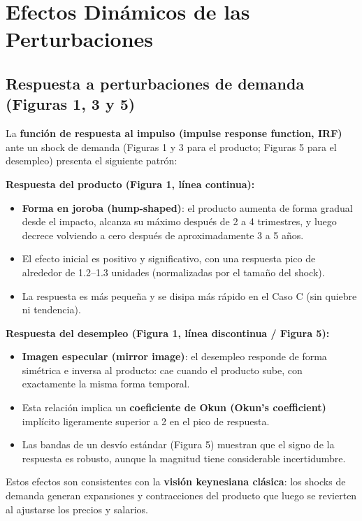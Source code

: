 \documentclass[12pt]{article}
\begin{document}
\section{Efectos Din\'amicos de las Perturbaciones}

\subsection{Respuesta a perturbaciones de demanda (Figuras 1, 3 y 5)}

La \textbf{funci\'on de respuesta al impulso (impulse response function, IRF)} ante un shock de demanda (Figuras 1 y 3 para el producto; Figuras 5 para el desempleo) presenta el siguiente patr\'on:

\textbf{Respuesta del producto (Figura 1, l\'inea continua):}
\begin{itemize}
  \item \textbf{Forma en joroba (hump-shaped)}: el producto aumenta de forma gradual desde el impacto, alcanza su m\'aximo despu\'es de 2 a 4 trimestres, y luego decrece volviendo a cero despu\'es de aproximadamente 3 a 5 a\~nos.
  \item El efecto inicial es positivo y significativo, con una respuesta pico de alrededor de 1.2--1.3 unidades (normalizadas por el tama\~no del shock).
  \item La respuesta es m\'as peque\~na y se disipa m\'as r\'apido en el Caso C (sin quiebre ni tendencia).
\end{itemize}

\textbf{Respuesta del desempleo (Figura 1, l\'inea discontinua / Figura 5):}
\begin{itemize}
  \item \textbf{Imagen especular (mirror image)}: el desempleo responde de forma sim\'etrica e inversa al producto: cae cuando el producto sube, con exactamente la misma forma temporal.
  \item Esta relaci\'on implica un \textbf{coeficiente de Okun (Okun's coefficient)} impl\'icito ligeramente superior a 2 en el pico de respuesta.
  \item Las bandas de un desv\'io est\'andar (Figura 5) muestran que el signo de la respuesta es robusto, aunque la magnitud tiene considerable incertidumbre.
\end{itemize}

Estos efectos son consistentes con la \textbf{visi\'on keynesiana cl\'asica}: los shocks de demanda generan expansiones y contracciones del producto que luego se revierten al ajustarse los precios y salarios.
\end{document}
